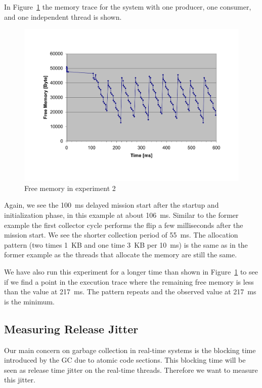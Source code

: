 In Figure~\ref{fig:ex2:mem} the memory trace for the system with one
producer, one consumer, and one independent thread is shown.
\begin{figure}
\begin{center}
    \includegraphics[width=\excelwidth]{jvm/gc_ex2}
    \caption{Free memory in experiment 2}
\label{fig:ex2:mem}
\end{center}
\end{figure}
%
Again, we see the 100~ms delayed mission start after the startup and
initialization phase, in this example at about 106~ms. Similar to
the former example the first collector cycle performs the flip a few
milliseconds after the mission start. We see the shorter collection
period of 55~ms. The allocation pattern (two times 1~KB and one time
3~KB per 10~ms) is the same as in the former example as the threads
that allocate the memory are still the same.

We have also run this experiment for a longer time than shown in
Figure~\ref{fig:ex2:mem} to see if we find a point in the execution
trace where the remaining free memory is less than the value at
217~ms. The pattern repeats and the observed value at 217~ms is the
minimum.




\subsection{Measuring Release Jitter}

Our main concern on garbage collection in real-time systems is the
blocking time introduced  by the GC due to atomic code sections.
This blocking time will be seen as release time jitter on the
real-time threads. Therefore we want to measure this jitter.

